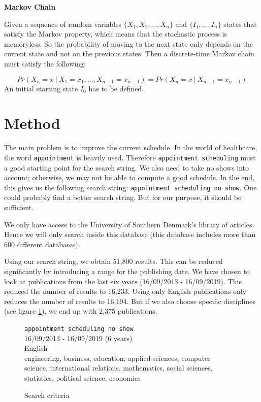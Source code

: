 \documentclass[a4paper,12pt]{article}
\begin{document}
\bigbreak
\textbf{Markov Chain}

Given a sequence of random variables $\{X_1,X_2,...,X_n\}$ and $\{I_1,\dots,I_n\}$ states that satisfy the Markov property, which means that the stochastic process is memoryless. So the probability of moving to the next state only depends on the current state and not on the previous states. Then a discrete-time Markov chain must satisfy the following:

\[ Pr(X_{n} = x \ | \ X_1 = x_1, \dots , X_{n-1} = x_{n-1}) = Pr(X_{n} = x \ | \ X_{n-1} = x_{n-1}) 
\]
An initial starting state $I_0$ has to be defined.
\section*{Method}

The main problem is to improve the current schedule. In the world of healthcare, the word \texttt{appointment} is heavily used. Therefore \texttt{appointment scheduling} must a good starting point for the search string. We also need to take no shows into account; otherwise, we may not be able to compute a good schedule. In the end, this gives us the following search string: \texttt{appointment scheduling no show}. One could probably find a better search string. But for our purpose, it should be sufficient.

\bigbreak

We only have access to the University of Southern Denmark's library of articles. Hence we will only search inside this database (this database includes more than 600 different databases).

\bigbreak

Using our search string, we obtain 51,800 results. This can be reduced significantly by introducing a range for the publishing date. We have chosen to look at publications from the last six years (16/09/2013 - 16/09/2019). This reduced the number of results to 16,233. Using only English publications only reduces the number of results to 16,194. But if we also choose specific disciplines (see figure \ref{search-criteria}), we end up with 2,375 publications.

\bigbreak

\begin{figure}[H]
    \begin{framed}
         \texttt{appointment scheduling no show} \\
         16/09/2013 - 16/09/2019 (6 years) \\
         English \\
         engineering, business, education, applied sciences, computer \\ \makebox[3.7cm][l]{} science, international relations, mathematics, social sciences, \\ \makebox[3.7cm][l]{} statistics, political science, economics
    \end{framed}
    \caption{Search criteria}
    \label{search-criteria}
\end{figure}
\end{document}
